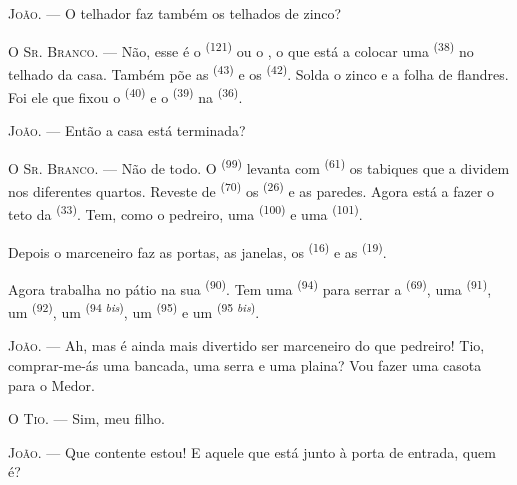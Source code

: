 \textsc{João}. --- O telhador faz também os telhados de zinco?

\textsc{O Sr. Branco}. --- Não, esse é o  \textsuperscript{(121)}
ou o , o que está a colocar uma 
\textsuperscript{(38)} no telhado da casa. Também põe as 
\textsuperscript{(43)} e os  \textsuperscript{(42)}. Solda o
zinco e a folha de flandres. Foi ele que fixou o 
\textsuperscript{(40)} e o  \textsuperscript{(39)} na 
\textsuperscript{(36)}.

\textsc{João}. --- Então a casa está terminada?

\VUsaut{3.0mm}
\VUsaut{3.0mm}

\textsc{O Sr. Branco}. --- Não de todo. O 
\textsuperscript{(99)} levanta com  \textsuperscript{(61)} os tabiques
que a dividem nos diferentes quartos. Reveste de 
\textsuperscript{(70)} os  \textsuperscript{(26)} e as paredes. Agora está
a fazer o teto da  \textsuperscript{(33)}. Tem, como o pedreiro,
uma  \textsuperscript{(100)} e uma 
\textsuperscript{(101)}.

Depois o marceneiro faz as portas, as janelas, os 
\textsuperscript{(16)} e as  \textsuperscript{(19)}.

Agora trabalha no pátio na sua 
\textsuperscript{(90)}. Tem uma  \textsuperscript{(94)} para serrar a
 \textsuperscript{(69)}, uma  \textsuperscript{(91)}, um
 \textsuperscript{(92)}, um  \textsuperscript{(94
\textit{bis})}, um  \textsuperscript{(95)} e um  \textsuperscript{(95 \textit{bis})}.

\textsc{João}. --- Ah, mas é ainda mais divertido ser marceneiro do que
pedreiro! Tio, comprar-me-ás uma bancada, uma serra e uma plaina? Vou
fazer uma casota para o Medor.

\textsc{O Tio}. --- Sim, meu filho.

\textsc{João}. --- Que contente estou! E aquele que está junto à porta de
entrada, quem é?

\VUsaut{3.0mm}
\VUsaut{3.0mm}


